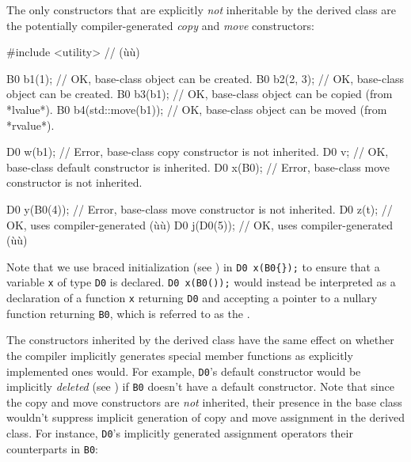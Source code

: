 \noindent The only constructors that are explicitly \emph{not} inheritable by the
derived class are the potentially compiler-generated \emph{copy} and
\emph{move} constructors:

\begin{emcppslisting}[emcppsbatch=e1]
#include <utility>  // (ù{}ù)

B0 b1(1);              // OK, base-class object can be created.
B0 b2(2, 3);           // OK, base-class object can be created.
B0 b3(b1);             // OK, base-class object can be copied (from *lvalue*).
B0 b4(std::move(b1));  // OK, base-class object can be moved (from *rvalue*).

D0 w(b1);    // Error, base-class copy constructor is not inherited.
D0 v;        // OK, base-class default constructor is inherited.
D0 x(B0{});  // Error, base-class move constructor is not inherited.

D0 y(B0(4));  // Error, base-class move constructor is not inherited.
D0 z(t);      // OK, uses compiler-generated (ù{}ù)
D0 j(D0(5));  // OK, uses compiler-generated (ù{}ù)
\end{emcppslisting}

\noindent Note that we use
 braced initialization (see )
  in \lstinline!D0!~\lstinline!x(B0{});!
  to ensure that a variable \lstinline!x! of type \lstinline!D0! is declared.
  \lstinline!D0!~\lstinline!x(B0());! would instead be interpreted as a
  declaration of a function \lstinline!x! returning \lstinline!D0! and
  accepting a pointer to a nullary function returning \lstinline!B0!, which
  is referred to as the .

The constructors inherited by the derived class have the same effect on
whether the compiler implicitly generates special member functions as
explicitly implemented ones would. For example, \lstinline!D0!'s default
constructor would be implicitly \emph{deleted} (see )
if
\lstinline!B0! doesn't have a default constructor. Note that since the copy
and move constructors are \emph{not} inherited, their presence in the
base class wouldn't suppress implicit generation of copy and move
assignment in the derived class. For instance, \lstinline!D0!'s implicitly
generated assignment operators  their
counterparts in \lstinline!B0!:

